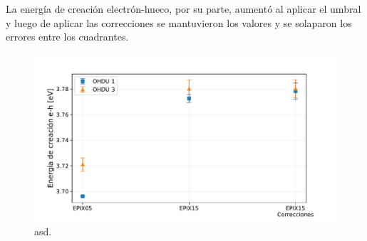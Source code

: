 La energía de creación electrón-hueco, por su parte, aumentó al aplicar el umbral y luego de aplicar las correcciones se mantuvieron los valores y se solaparon los errores entre los cuadrantes.
\begin{figure}[h]
    \centering
        \includegraphics[scale=0.5]{Figs/F_energia_creacion_eh.pdf}
    \caption{\footnotesize{asd.}}
    \label{fig:F_energia_creacion_eh}
\end{figure}


